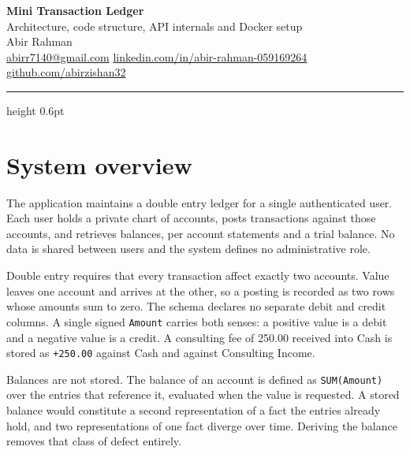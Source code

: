 \documentclass[11pt,a4paper]{article}
\newcommand{\code}[1]{\texttt{\fontsize{8.6}{10}\selectfont #1}}
\begin{document}
\thispagestyle{fancy}
\begin{center}
  {\sffamily\fontsize{20}{24}\selectfont\bfseries Mini Transaction Ledger}\\[3pt]
  {\sffamily\fontsize{11}{13}\selectfont\color{black!60}
   Architecture, code structure, API internals and Docker setup}\\[10pt]
  {\sffamily\fontsize{11}{13}\selectfont Abir Rahman}\\[4pt]
  {\sffamily\fontsize{8.6}{11}\selectfont
   \href{mailto:abirr7140@gmail.com}{abirr7140@gmail.com}
   \;\textcolor{rule}{\textbar}\;
   \href{https://www.linkedin.com/in/abir-rahman-059169264/}{linkedin.com/in/abir-rahman-059169264}
   \;\textcolor{rule}{\textbar}\;
   \href{https://github.com/abirzishan32}{github.com/abirzishan32}}
\end{center}
\vspace{2pt}
{\color{rule}\hrule height 0.6pt}
\vspace{10pt}

\section{System overview}

The application maintains a double entry ledger for a single authenticated
user. Each user holds a private chart of accounts, posts transactions against
those accounts, and retrieves balances, per account statements and a trial
balance. No data is shared between users and the system defines no
administrative role.

Double entry requires that every transaction affect exactly two accounts. Value
leaves one account and arrives at the other, so a posting is recorded as two
rows whose amounts sum to zero. The schema declares no separate debit and credit
columns. A single signed \code{Amount} carries both senses: a positive value is
a debit and a negative value is a credit. A consulting fee of 250.00 received
into Cash is stored as \code{+250.00} against Cash and \code{-250.00} against
Consulting Income.

Balances are not stored. The balance of an account is defined as
\code{SUM(Amount)} over the entries that reference it, evaluated when the value
is requested. A stored balance would constitute a second representation of a
fact the entries already hold, and two representations of one fact diverge over
time. Deriving the balance removes that class of defect entirely.
\end{document}
